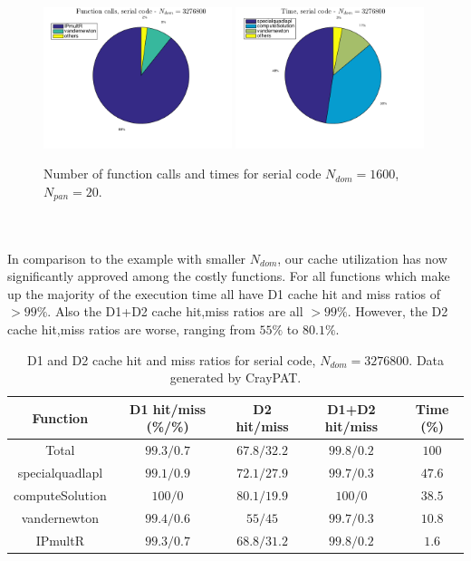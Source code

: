 \documentclass[a4paper,10pt]{article}
\begin{document}
\begin{figure}[ht]
    \begin{center}
        \includegraphics[width=0.49\textwidth]{Graphics/craypat_serial_batch10_calls_pie.png}
        \includegraphics[width=0.49\textwidth]{Graphics/craypat_serial_batch10_time_pie.png}
    \end{center}
    \caption{Number of function calls and times for serial code $N_{dom} = 1600$, $N_{pan} = 20$.}
    \label{fig:batch10_serial_pie}
\end{figure} \\ \\
In comparison to the example with smaller $N_{dom}$, our cache utilization has now significantly approved among the costly functions. For all functions which make up the majority of the execution time all have D1 cache hit and miss ratios of $>99\%$. Also the D1+D2 cache hit,miss ratios are all $>99\%$. However, the D2 cache hit,miss ratios are worse, ranging from $55\%$ to $80.1\%$. 
\begin{table}[ht]
\begin{center}
    \begin{tabular}{ c | c | c | c | c }
        Function & D1 hit/miss (\%/\%) & D2 hit/miss & D1+D2 hit/miss & Time (\%) \\ \hline
        Total & $99.3/0.7$ & $67.8/32.2$ & $99.8/0.2$ & $100$ \\ 
        specialquadlapl & $99.1/0.9$ & $72.1/27.9$ & $99.7/0.3$ & $47.6$ \\
        computeSolution & $100/0$ & $80.1/19.9$ & $100/0$ & $38.5$ \\
        vandernewton & $99.4/0.6$ & $55/45$ & $99.7/0.3$ & $10.8$ \\
        IPmultR & $99.3/0.7$ & $68.8/31.2$ & $99.8/0.2$ & $1.6$
    \end{tabular}
    \caption{D1 and D2 cache hit and miss ratios for serial code, $N_{dom} = 3276800$. Data generated by CrayPAT.}
    \label{tab:batch4_serial_caches}
\end{center}
\end{table}  
\end{document}
